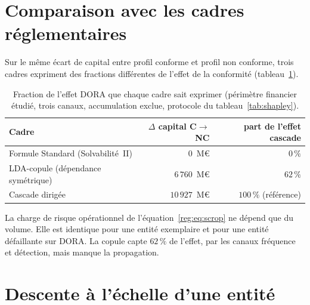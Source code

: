 \section{Comparaison avec les cadres réglementaires}
\label{sec:regard-reglementaire}

Sur le même écart de capital entre profil conforme et profil non conforme, trois cadres expriment des
fractions différentes de l'effet de la conformité (tableau~\ref{tab:benchmark-sf}).

\begin{table}[H]\centering\small
\renewcommand{\arraystretch}{1.25}
\begin{tabular}{@{}l r r@{}}
\toprule
\textbf{Cadre} & \textbf{$\Delta$ capital C$\to$NC} & \textbf{part de l'effet cascade} \\
\midrule
Formule Standard (Solvabilité~II) & $0$~M\euro{} & $0\,\%$ \\
LDA-copule (dépendance symétrique) & $6\,760$~M\euro{} & $62\,\%$ \\
Cascade dirigée & $10\,927$~M\euro{} & $100\,\%$ (référence) \\
\bottomrule
\end{tabular}
\caption{Fraction de l'effet DORA que chaque cadre sait exprimer (périmètre financier étudié, trois
canaux, accumulation exclue, protocole du tableau~\ref{tab:shapley}).}
\label{tab:benchmark-sf}
\end{table}

La charge de risque opérationnel de l'équation~\eqref{reg:eq:scrop} ne dépend que du volume. Elle
est identique pour une entité exemplaire et pour une entité défaillante sur DORA. La copule capte
$62\,\%$ de l'effet, par les canaux fréquence et détection, mais manque la propagation.

\section{Descente à l'échelle d'une entité}
\label{sec:ancrage}


